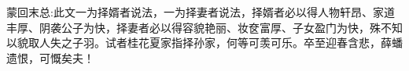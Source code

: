 \begin{parag}
    \begin{note}蒙回末总:此文一为择婿者说法，一为择妻者说法，择婿者必以得人物轩昂、家道丰厚、阴袭公子为快，择妻者必以得容貌艳丽、妆奁富厚、子女盈门为快，殊不知以貌取人失之子羽。试者桂花夏家指择孙家，何等可羡可乐。卒至迎春含悲，薛蟠遗恨，可慨矣夫！\end{note}
\end{parag}
